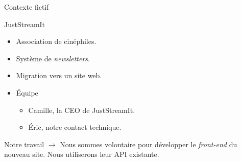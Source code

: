 \begin{frame}{Contexte fictif}
  \begin{block}{JustStreamIt}
    \begin{itemize}
    \item Association de cinéphiles.
    \item Système de \textit{newsletters}.
    \item Migration vers un site web.
    \item Équipe
      \begin{itemize}
      \item Camille, la CEO de JustStreamIt.
      \item Éric, notre contact technique.
      \end{itemize}
    \end{itemize}
  \end{block}
  
  \begin{block}{Notre travail}
    $\rightarrow$ Nous sommes volontaire pour développer le
    \textit{front-end} du nouveau site. Nous utiliserons leur API existante.
  \end{block}
\end{frame}
